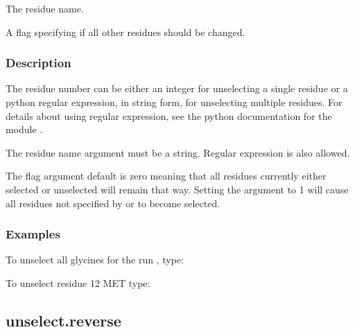   The residue name. 

  A flag specifying if all other residues should be changed. 




\subsubsection{Description}

The residue number can be either an integer for unselecting a single residue or a python regular expression, in string form, for unselecting multiple residues.  For details about using regular expression, see the python documentation for the module .


The residue name argument must be a string.  Regular expression is also allowed.


The  flag argument default is zero meaning that all residues currently either selected or unselected will remain that way.  Setting the argument to 1 will cause all residues not specified by  or  to become selected.



\subsubsection{Examples}

To unselect all glycines for the run , type:




To unselect residue 12 MET type:









\newpage

\subsection{unselect.reverse}


